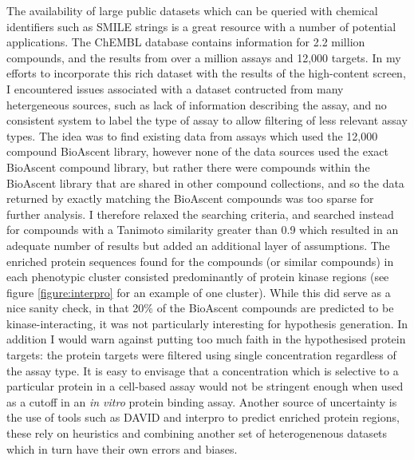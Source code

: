 \documentclass[a4paper,11pt,twoside,openright]{scrbook}
\begin{document}
The availability of large public datasets which can be queried with chemical identifiers such as SMILE strings is a great resource with a number of potential applications.
The ChEMBL database contains information for 2.2 million compounds, and the results from over a million assays and 12,000 targets.
In my efforts to incorporate this rich dataset with the results of the high-content screen, I encountered issues associated with a dataset contructed from many hetergeneous sources, such as lack of information describing the assay, and no consistent system to label the type of assay to allow filtering of less relevant assay types.
The idea was to find existing data from assays which used the 12,000 compound BioAscent library, however none of the data sources used the exact BioAscent compound library, but rather there were compounds within the BioAscent library that are shared in other compound collections, and so the data returned by exactly matching the BioAscent compounds was too sparse for further analysis.
I therefore relaxed the searching criteria, and searched instead for compounds with a Tanimoto similarity greater than 0.9 which resulted in an adequate number of results but added an additional layer of assumptions.
The enriched protein sequences found for the compounds (or similar compounds) in each phenotypic cluster consisted predominantly of protein kinase regions (see figure \ref{figure:interpro} for an example of one cluster).
While this did serve as a nice sanity check, in that 20\% of the BioAscent compounds are predicted to be kinase-interacting, it was not particularly interesting for hypothesis generation.
In addition I would warn against putting too much faith in the hypothesised protein targets: the protein targets were filtered using single concentration regardless of the assay type.
It is easy to envisage that a concentration which is selective to a particular protein in a cell-based assay would not be stringent enough when used as a cutoff in an \textit{in vitro} protein binding assay.
Another source of uncertainty is the use of tools such as DAVID and interpro to predict enriched protein regions, these rely on heuristics and combining another set of heterogenenous datasets which in turn have their own errors and biases.
\end{document}
